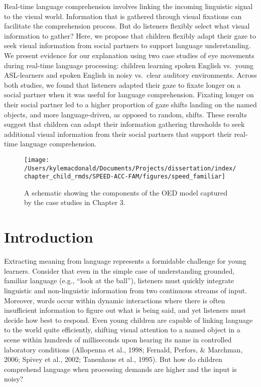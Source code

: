 \documentclass[oneside]{report}
\begin{document}
Real-time language comprehension involves linking the incoming
linguistic signal to the visual world. Information that is gathered
through visual fixations can facilitate the comprehension process. But
do listeners flexibly select what visual information to gather? Here, we
propose that children flexibly adapt their gaze to seek visual
information from social partners to support language understanding. We
present evidence for our explanation using two case studies of eye
movements during real-time language processing: children learning spoken
English vs.~young ASL-learners and spoken English in noisy vs.~clear
auditory environments. Across both studies, we found that listeners
adapted their gaze to fixate longer on a social partner when it was
useful for language comprehension. Fixating longer on their social
partner led to a higher proportion of gaze shifts landing on the named
objects, and more language-driven, as opposed to random, shifts. These
results suggest that children can adapt their information gathering
thresholds to seek additional visual information from their social
partners that support their real-time language comprehension.
\begin{figure}[!t]

{\centering \texttt{[image: /Users/kylemacdonald/Documents/Projects/dissertation/index/chapter\_child\_rmds/SPEED-ACC-FAM/figures/speed\_familiar]} 

}

\caption[Overview of Chapter 3.]{A schematic showing the components of the OED model captured by the case studies in Chapter 3.}\label{fig:schematic-speed-fam}
\end{figure}
\section{Introduction}\label{introduction-2}

Extracting meaning from language represents a formidable challenge for
young learners. Consider that even in the simple case of understanding
grounded, familiar language (e.g., ``look at the ball''), listeners must
quickly integrate linguistic and non-linguistic information from two
continuous streams of input. Moreover, words occur within dynamic
interactions where there is often insufficient information to figure out
what is being said, and yet listeners must decide how best to respond.
Even young children are capable of linking language to the world quite
efficiently, shifting visual attention to a named object in a scene
within hundreds of milliseconds upon hearing its name in controlled
laboratory conditions (Allopenna et al., 1998; Fernald, Perfors, \&
Marchman, 2006; Spivey et al., 2002; Tanenhaus et al., 1995). But how do
children comprehend language when processing demands are higher and the
input is noisy?
\end{document}

